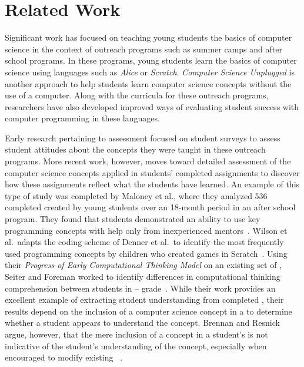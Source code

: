 \section{Related Work}
Significant work has focused on teaching young students the basics of computer
science in the context of outreach programs such as summer camps and after
school programs. In these programs, young students learn the basics of computer
science using languages such as \emph{Alice} or \emph{Scratch}. \emph{Computer
  Science Unplugged} is another approach to help students learn computer
science concepts without the use of a computer. Along with the curricula for
these outreach programs, researchers have also developed improved ways of
evaluating student success with computer programming in these languages.

Early research pertaining to assessment focused on student surveys to assess
student attitudes about the concepts they were taught in these outreach
programs. More recent work, however, moves toward detailed assessment of the
computer science concepts applied in students' completed assignments to
discover how these assignments reflect what the students have learned. An
example of this type of study was completed by Maloney et al., where they
analyzed 536 completed  created by young students over an 18-month
period in an after school program. They found that students demonstrated an
ability to use key programming concepts with help only from inexperienced
mentors~\cite{Maloney:2008:PCU:1352135.1352260}. Wilson et al.\ adapts the
coding scheme of Denner et al.\ to identify the most frequently used
programming concepts by children who created games in
Scratch~\cite{Denner:2012:CGC:2072695.2073050, wilson12}. Using their
\emph{Progress of Early Computational Thinking Model} on an existing set of
, Seiter and Foreman worked to identify differences in
computational thinking comprehension between students in --
grade~\cite{Seiter:2013:MLP:2493394.2493403}. While their work provides an
excellent example of extracting student understanding from completed
, their results depend on the inclusion of a computer science
concept in a \sprogram{} to determine whether a student appears to understand
the concept. Brennan and Resnick argue, however, that the mere inclusion of a
concept in a student's \sprogram{} is not indicative of the student's
understanding of the concept, especially when encouraged to modify existing
~\cite{brennan12}.


